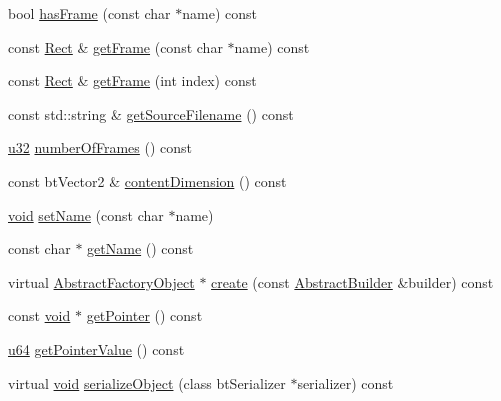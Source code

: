 \begin{DoxyCompactItemize}
\item 
bool \mbox{\hyperlink{classnjli_1_1_sprite_frame_atlas_a9febd69e673836a7ec521c26f63df543}{has\+Frame}} (const char $\ast$name) const
\item 
const \mbox{\hyperlink{classnjli_1_1_rect}{Rect}} \& \mbox{\hyperlink{classnjli_1_1_sprite_frame_atlas_a05db5e5a525a1c9824dc2c59fbd1f57e}{get\+Frame}} (const char $\ast$name) const
\item 
const \mbox{\hyperlink{classnjli_1_1_rect}{Rect}} \& \mbox{\hyperlink{classnjli_1_1_sprite_frame_atlas_af1b18ca67a6237830f17df7ba9aa9b33}{get\+Frame}} (int index) const
\item 
const std\+::string \& \mbox{\hyperlink{classnjli_1_1_sprite_frame_atlas_a5cc4b4e987a852f650fc1b85df38309e}{get\+Source\+Filename}} () const
\item 
\mbox{\hyperlink{_util_8h_a10e94b422ef0c20dcdec20d31a1f5049}{u32}} \mbox{\hyperlink{classnjli_1_1_sprite_frame_atlas_a214363a5b72eab0d51e349927ed65da6}{number\+Of\+Frames}} () const
\item 
const bt\+Vector2 \& \mbox{\hyperlink{classnjli_1_1_sprite_frame_atlas_a9b95722e49128c1e1fef2e82152b9c84}{content\+Dimension}} () const
\item 
\mbox{\hyperlink{_thread_8h_af1e856da2e658414cb2456cb6f7ebc66}{void}} \mbox{\hyperlink{classnjli_1_1_sprite_frame_atlas_a087eb5f8d9f51cc476f12f1d10a3cb95}{set\+Name}} (const char $\ast$name)
\item 
const char $\ast$ \mbox{\hyperlink{classnjli_1_1_sprite_frame_atlas_ad41266885be835f3ee602311e20877a4}{get\+Name}} () const
\item 
virtual \mbox{\hyperlink{classnjli_1_1_abstract_factory_object}{Abstract\+Factory\+Object}} $\ast$ \mbox{\hyperlink{classnjli_1_1_sprite_frame_atlas_a83a8876ae63b92804004cf3febe76573}{create}} (const \mbox{\hyperlink{classnjli_1_1_abstract_builder}{Abstract\+Builder}} \&builder) const
\item 
const \mbox{\hyperlink{_thread_8h_af1e856da2e658414cb2456cb6f7ebc66}{void}} $\ast$ \mbox{\hyperlink{classnjli_1_1_sprite_frame_atlas_ac4ca71716ed832be357f15f8262c8448}{get\+Pointer}} () const
\item 
\mbox{\hyperlink{_util_8h_ad758b7a5c3f18ed79d2fcd23d9f16357}{u64}} \mbox{\hyperlink{classnjli_1_1_sprite_frame_atlas_a4ffddf141a426a5a07d0ac19f1913811}{get\+Pointer\+Value}} () const
\item 
virtual \mbox{\hyperlink{_thread_8h_af1e856da2e658414cb2456cb6f7ebc66}{void}} \mbox{\hyperlink{classnjli_1_1_sprite_frame_atlas_a4fc4bcd9d1930911474210c047372fc0}{serialize\+Object}} (class bt\+Serializer $\ast$serializer) const
\end{DoxyCompactItemize}
